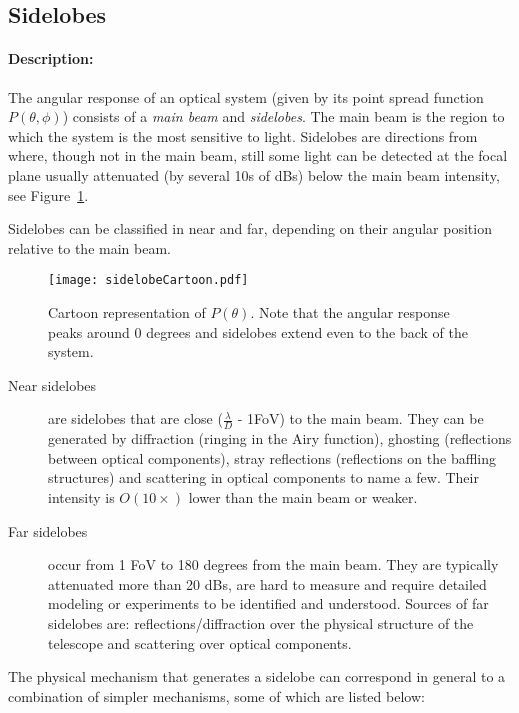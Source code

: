 \subsection{Sidelobes}

\paragraph{Description:}
The angular response of an optical system (given by its point spread function $P(\theta, \phi)$) consists of a \emph{main beam} and \emph{sidelobes}. The main beam is the region to which the system is the most sensitive to light. Sidelobes are directions from where, though not in the main beam, still some light can be detected at the focal plane usually attenuated (by several 10s of dBs) below the main beam intensity, see Figure~\ref{fig:cartoonSidelobe}.

Sidelobes can be classified in near and far, depending on their angular position relative to the main beam.

\begin{figure}[h]
\label{fig:cartoonSidelobe}
\centering
\texttt{[image: sidelobeCartoon.pdf]}
\caption{Cartoon representation of $P(\theta)$. Note that the angular response peaks around 0 degrees and sidelobes extend even to the back of the system.}
\end{figure}


\begin{description}
\item[Near sidelobes] are sidelobes that are close ($\frac{\lambda}{D}$ - 1FoV) to the main beam. They can be generated by diffraction (ringing in the Airy function), ghosting (reflections between optical components), stray reflections (reflections on the baffling structures) and scattering in optical components to name a few. Their intensity is $O(10\times)$ lower than the main beam or weaker.

\item[Far sidelobes] occur from 1 FoV to 180 degrees from the main beam. They are typically attenuated more than 20 dBs, are hard to measure and require detailed modeling or experiments to be identified and understood. Sources of far sidelobes are: reflections/diffraction over the physical structure of the telescope and scattering over optical components. 
\end{description}

The physical mechanism that generates a sidelobe can correspond in general to a combination of simpler mechanisms, some of which are listed below: 

